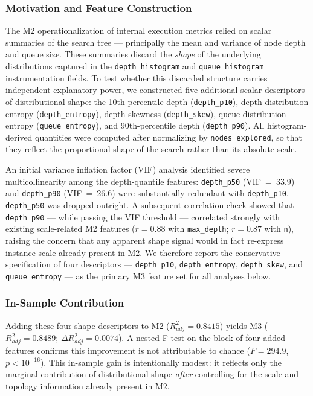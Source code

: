 \documentclass[11pt,a4paper]{article}
\begin{document}
\subsubsection*{Motivation and Feature Construction}
The M2 operationalization of internal execution metrics relied on scalar summaries of the search tree --- principally the mean and variance of node depth and queue size. These summaries discard the \emph{shape} of the underlying distributions captured in the \texttt{depth\_histogram} and \texttt{queue\_histogram} instrumentation fields. To test whether this discarded structure carries independent explanatory power, we constructed five additional scalar descriptors of distributional shape: the 10th-percentile depth (\texttt{depth\_p10}), depth-distribution entropy (\texttt{depth\_entropy}), depth skewness (\texttt{depth\_skew}), queue-distribution entropy (\texttt{queue\_entropy}), and 90th-percentile depth (\texttt{depth\_p90}). All histogram-derived quantities were computed after normalizing by \texttt{nodes\_explored}, so that they reflect the proportional shape of the search rather than its absolute scale.

An initial variance inflation factor (VIF) analysis identified severe multicollinearity among the depth-quantile features: \texttt{depth\_p50} (VIF~=~33.9) and \texttt{depth\_p90} (VIF~=~26.6) were substantially redundant with \texttt{depth\_p10}. \texttt{depth\_p50} was dropped outright. A subsequent correlation check showed that \texttt{depth\_p90} --- while passing the VIF threshold --- correlated strongly with existing scale-related M2 features ($r = 0.88$ with \texttt{max\_depth}; $r = 0.87$ with \texttt{n}), raising the concern that any apparent shape signal would in fact re-express instance scale already present in M2. We therefore report the conservative specification of four descriptors --- \texttt{depth\_p10}, \texttt{depth\_entropy}, \texttt{depth\_skew}, and \texttt{queue\_entropy} --- as the primary M3 feature set for all analyses below.

\subsubsection*{In-Sample Contribution}
Adding these four shape descriptors to M2 ($R^2_{adj}=0.8415$) yields M3 ($R^2_{adj}=0.8489$; $\Delta R^2_{adj}=0.0074$). A nested F-test on the block of four added features confirms this improvement is not attributable to chance ($F=294.9$, $p < 10^{-16}$). This in-sample gain is intentionally modest: it reflects only the marginal contribution of distributional shape \emph{after} controlling for the scale and topology information already present in M2.
\end{document}
